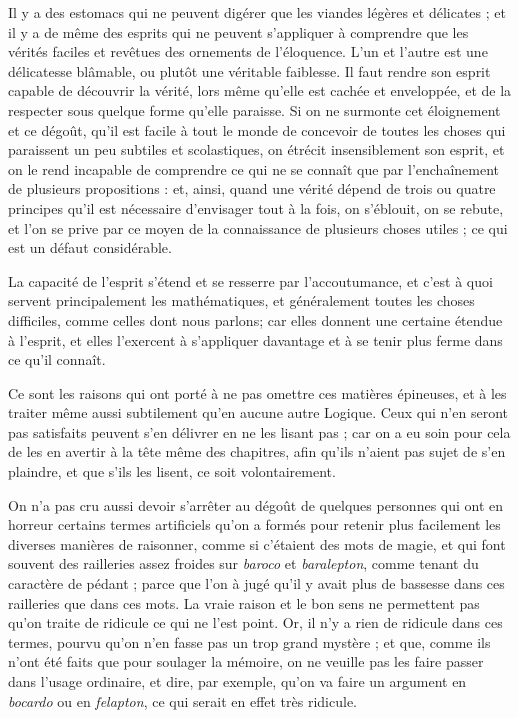Il y a des estomacs qui ne peuvent digérer que les viandes légères et délicates ; et il y a de même des esprits qui ne peuvent s'appliquer à comprendre que les vérités faciles et revêtues des ornements de l'éloquence. L'un et l'autre est une délicatesse blâmable, ou plutôt une véritable faiblesse. Il faut rendre son esprit capable de découvrir la vérité, lors même qu'elle est cachée et enveloppée, et de la respecter sous quelque forme qu'elle paraisse. Si on ne surmonte cet éloignement et ce dégoût, qu'il est facile à tout le monde de concevoir de toutes les choses qui paraissent un peu subtiles et scolastiques, on étrécit insensiblement son esprit, et on le rend incapable de comprendre ce qui ne se connaît que par l'enchaînement de plusieurs propositions : et, ainsi, quand une vérité dépend de trois ou quatre principes qu'il est nécessaire d'envisager tout à la fois, on s'éblouit, on se rebute, et l'on se prive par ce moyen de la connaissance de plusieurs choses utiles ; ce qui est un défaut considérable.

La capacité de l'esprit s'étend et se resserre par l'accoutumance, et c'est à quoi servent principalement les mathématiques, et généralement toutes les choses difficiles, comme celles dont nous parlons; car elles donnent une certaine étendue à l'esprit, et elles l'exercent à s'appliquer davantage et à se tenir plus ferme dans ce qu'il connaît.

Ce sont les raisons qui ont porté à ne pas omettre ces matières épineuses, et à les traiter même aussi subtilement qu'en aucune autre Logique. Ceux qui n'en seront pas satisfaits peuvent s'en délivrer en ne les lisant pas ; car on a eu soin pour cela de les en avertir à la tête même des chapitres, afin qu'ils n'aient pas sujet de s'en plaindre, et que s'ils les lisent, ce soit volontairement.

On n'a pas cru aussi devoir s'arrêter au dégoût de quelques personnes qui ont en horreur certains termes artificiels qu'on a formés pour retenir plus facilement les diverses manières de raisonner, comme si c'étaient des mots de magie, et qui font souvent des railleries assez froides sur \emph{baroco} et \emph{baralepton}, comme tenant du caractère de pédant ; parce que l'on à jugé qu'il y avait plus de bassesse dans ces railleries que dans ces mots. La vraie raison et le bon sens ne permettent pas qu'on traite de ridicule ce qui ne l'est point. Or, il n'y a rien de ridicule dans ces termes, pourvu qu'on n'en fasse pas un trop grand mystère ; et que, comme ils n'ont été faits que pour soulager la mémoire, on ne veuille pas les faire passer dans l'usage ordinaire, et dire, par exemple, qu'on va faire un argument en \emph{bocardo} ou en \emph{felapton}, ce qui serait en effet très ridicule.

